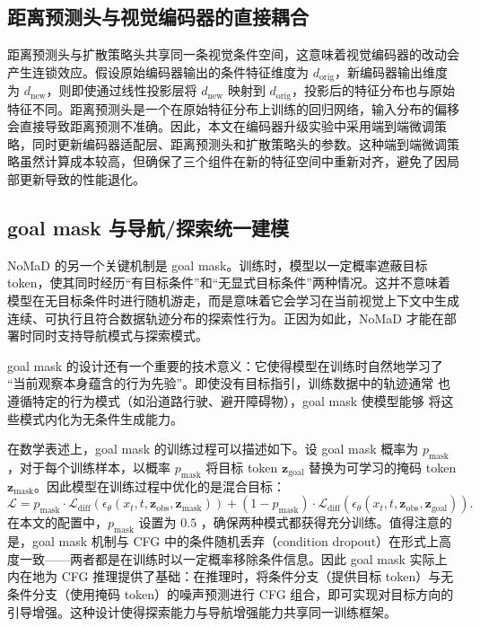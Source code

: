 \subsection{距离预测头与视觉编码器的直接耦合}

距离预测头与扩散策略头共享同一条视觉条件空间，这意味着视觉编码器的改动会产生连锁效应。假设原始编码器输出的条件特征维度为 $d_{\text{orig}}$，新编码器输出维度为 $d_{\text{new}}$，则即使通过线性投影层将 $d_{\text{new}}$ 映射到 $d_{\text{orig}}$，投影后的特征分布也与原始特征不同。距离预测头是一个在原始特征分布上训练的回归网络，输入分布的偏移会直接导致距离预测不准确。因此，本文在编码器升级实验中采用端到端微调策略，同时更新编码器适配层、距离预测头和扩散策略头的参数。这种端到端微调策略虽然计算成本较高，但确保了三个组件在新的特征空间中重新对齐，避免了因局部更新导致的性能退化。

\subsection{goal mask 与导航/探索统一建模}

NoMaD 的另一个关键机制是 goal mask。训练时，模型以一定概率遮蔽目标 token，使其同时经历``有目标条件''和``无显式目标条件''两种情况\cite{nomad2023}。这并不意味着模型在无目标条件时进行随机游走，而是意味着它会学习在当前视觉上下文中生成连续、可执行且符合数据轨迹分布的探索性行为。正因为如此，NoMaD 才能在部署时同时支持导航模式与探索模式。

goal mask 的设计还有一个重要的技术意义：它使得模型在训练时自然地学习了
``当前观察本身蕴含的行为先验''。即使没有目标指引，训练数据中的轨迹通常
也遵循特定的行为模式（如沿道路行驶、避开障碍物），goal mask 使模型能够
将这些模式内化为无条件生成能力。

在数学表述上，goal mask 的训练过程可以描述如下。设 goal mask 概率为 $p_{\text{mask}}$，对于每个训练样本，以概率 $p_{\text{mask}}$ 将目标 token $\mathbf{z}_{\text{goal}}$ 替换为可学习的掩码 token $\mathbf{z}_{\text{mask}}$。因此模型在训练过程中优化的是混合目标：
\begin{equation}
\mathcal{L} = p_{\text{mask}} \cdot \mathcal{L}_{\text{diff}}(\epsilon_\theta(x_t, t, \mathbf{z}_{\text{obs}}, \mathbf{z}_{\text{mask}})) + (1 - p_{\text{mask}}) \cdot \mathcal{L}_{\text{diff}}(\epsilon_\theta(x_t, t, \mathbf{z}_{\text{obs}}, \mathbf{z}_{\text{goal}})).
\end{equation}
在本文的配置中，$p_{\text{mask}}$ 设置为 $0.5$ ，确保两种模式都获得充分训练。值得注意的是，goal mask 机制与 CFG 中的条件随机丢弃（condition dropout）在形式上高度一致——两者都是在训练时以一定概率移除条件信息。因此 goal mask 实际上内在地为 CFG 推理提供了基础：在推理时，将条件分支（提供目标 token）与无条件分支（使用掩码 token）的噪声预测进行 CFG 组合，即可实现对目标方向的引导增强。这种设计使得探索能力与导航增强能力共享同一训练框架。

